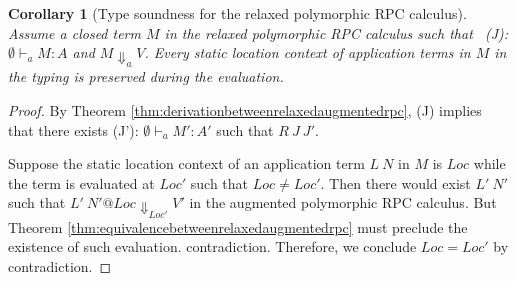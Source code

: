 \documentclass[a4paper]{article}
\makeatletter
\theoremstyle{plain}
\newtheorem{corollary}[theorem]{Corollary}
\theoremstyle{definition}
\newcommand{\evalRPC}[3]{#1\Downarrow_{#2}#3}
\newcommand{\typing}[4]{#1\vdash_{#2} #3 : #4}
\newcommand{\Loc}{Loc}
\newcommand{\at}[1]{@#1}
\newcommand{\logicalRelText}{R}
\newcommand{\logicalRel}[2]{\logicalRelText \ #1 \ #2}
\makeatother
\begin{document}
\begin{corollary}[Type soundness for the relaxed polymorphic RPC calculus]
%
Assume a closed term $M$ in the relaxed polymorphic RPC calculus such
that \ (J): $\typing{\emptyset}{a}{M}{A}$ and $\evalRPC{M}{a}{V}$.
%
Every static location context of application terms in $M$ in the
typing is preserved during the evaluation.
\label{thm:typesoundnessforrelaxedpolyrpc}
\end{corollary}
\begin{proof}
%
By Theorem \ref{thm:derivationbetweenrelaxedaugmentedrpc}, (J) implies
that there exists (J'): $\typing{\emptyset}{a}{M'}{A'}$ such that
$\logicalRel{J}{J'}$.

%
Suppose the static location context of an application term $L \ N$ in
$M$ is $\Loc$ while the term is evaluated at $\Loc'$ such that
$\Loc\not=\Loc'$.
%
Then there would exist $L' \ N'$ such that $\evalRPC{L' \ N'
\at{\Loc}}{\Loc'}{V'}$ in the augmented polymorphic RPC calculus.
%
But Theorem
\ref{thm:equivalencebetweenrelaxedaugmentedrpc}
must preclude the existence of such evaluation. 
contradiction.
%
Therefore, we conclude $\Loc=\Loc'$ by contradiction.
\end{proof}
\end{document}
